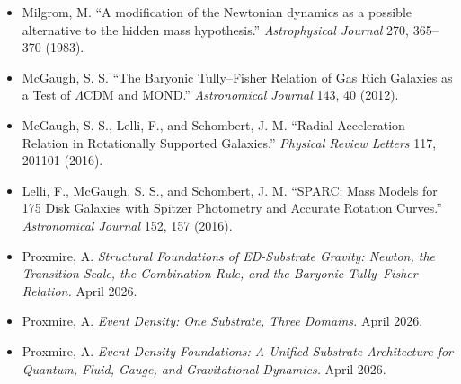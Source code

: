 \documentclass[11pt,a4paper]{article}
\begin{document}
\begin{itemize}[leftmargin=*,itemsep=2pt]
  \item Milgrom, M. ``A modification of the Newtonian dynamics as a possible alternative to the hidden mass hypothesis.'' \emph{Astrophysical Journal} 270, 365--370 (1983).
  \item McGaugh, S. S. ``The Baryonic Tully--Fisher Relation of Gas Rich Galaxies as a Test of $\Lambda$CDM and MOND.'' \emph{Astronomical Journal} 143, 40 (2012).
  \item McGaugh, S. S., Lelli, F., and Schombert, J. M. ``Radial Acceleration Relation in Rotationally Supported Galaxies.'' \emph{Physical Review Letters} 117, 201101 (2016).
  \item Lelli, F., McGaugh, S. S., and Schombert, J. M. ``SPARC: Mass Models for 175 Disk Galaxies with Spitzer Photometry and Accurate Rotation Curves.'' \emph{Astronomical Journal} 152, 157 (2016).
  \item Proxmire, A. \emph{Structural Foundations of ED-Substrate Gravity: Newton, the Transition Scale, the Combination Rule, and the Baryonic Tully--Fisher Relation.} April 2026.
  \item Proxmire, A. \emph{Event Density: One Substrate, Three Domains.} April 2026.
  \item Proxmire, A. \emph{Event Density Foundations: A Unified Substrate Architecture for Quantum, Fluid, Gauge, and Gravitational Dynamics.} April 2026.
\end{itemize}
\end{document}
